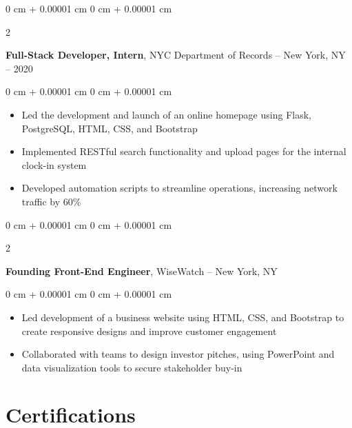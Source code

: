 \documentclass[10pt, letterpaper]{article}
\newenvironment{highlights}{
    \begin{itemize}[
        topsep=0.10 cm,
        parsep=0.10 cm,
        partopsep=0pt,
        itemsep=0pt,
        leftmargin=0 cm + 10pt
    ]
}{
    \end{itemize}
} %
\newenvironment{onecolentry}{
    \begin{adjustwidth}{
        0 cm + 0.00001 cm
    }{
        0 cm + 0.00001 cm
    }
}{
    \end{adjustwidth}
} %
\newenvironment{twocolentry}[2][]{
    \onecolentry
    \def\secondColumn{#2}
    \setcolumnwidth{\fill, 4.5 cm}
    \begin{paracol}{2}
}{
    \switchcolumn \raggedleft \secondColumn
    \end{paracol}
    \endonecolentry
} %
\begin{document}
        \begin{twocolentry}{
            2019 -- 2020
        }
            \textbf{Full-Stack Developer, Intern}, NYC Department of Records -- New York, NY\end{twocolentry}

        \vspace{0.10 cm}
        \begin{onecolentry}
            \begin{highlights}
                \item Led the development and launch of an online homepage using Flask, PostgreSQL, HTML, CSS, and Bootstrap
                \item Implemented RESTful search functionality and upload pages for the internal clock-in system
                \item Developed automation scripts to streamline operations, increasing network traffic by 60\%
            \end{highlights}
        \end{onecolentry}


        \vspace{0.35 cm}

        \begin{twocolentry}{
            2019
        }
            \textbf{Founding Front-End Engineer}, WiseWatch -- New York, NY\end{twocolentry}

        \vspace{0.10 cm}
        \begin{onecolentry}
            \begin{highlights}
                \item Led development of a business website using HTML, CSS, and Bootstrap to create responsive designs and improve customer engagement
                \item Collaborated with teams to design investor pitches, using PowerPoint and data visualization tools to secure stakeholder buy-in
            \end{highlights}
        \end{onecolentry}


    \vspace{.3 cm}
    
    \section{Certifications}
\end{document}
